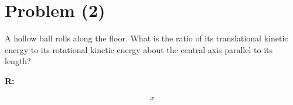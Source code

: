 \section{Problem (2)}

	A hollow ball rolls along the floor. What is the ratio of its translational kinetic energy to its rotational kinetic energy about the central axis parallel to its length?

	\textbf{R:}

	\begin{align}
		x
	\end{align}
